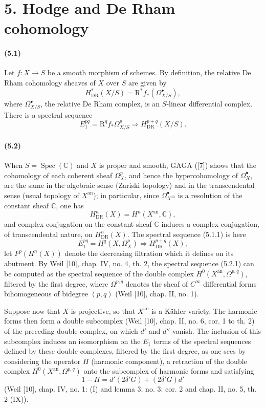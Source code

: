 \documentclass[10pt]{article}
\newcommand{\R}{\mathrm R}
\providecommand{\C}{\mathbb C}
\providecommand{\Spec}{\operatorname{Spec}}
\providecommand{\DR}{\operatorname{DR}}
\providecommand{\an}{\mathrm{an}}
\begin{document}
\section*{5. Hodge and De Rham cohomology}

\paragraph{(5.1)} Let $f:X\to S$ be a smooth morphism of schemes. By definition, the relative De Rham cohomology sheaves of $X$ over $S$ are given by
\[
H_{\DR}^*(X/S)=\R^*f_*(\Omega_{X/S}^\bullet),
\]
where $\Omega_{X/S}^\bullet$, the relative De Rham complex, is an $S$-linear differential complex. There is a spectral sequence
\[
\tag{5.1.1}
E_1^{pq}=\R^qf_*\Omega_{X/S}^p\Longrightarrow H_{\DR}^{p+q}(X/S).
\]

\paragraph{(5.2)} When $S=\Spec(\C)$ and $X$ is proper and smooth, GAGA ([7]) shows that the cohomology of each coherent sheaf $\Omega_X^p$, and hence the hypercohomology of $\Omega_X^\bullet$, are the same in the algebraic sense (Zariski topology) and in the transcendental sense (usual topology of $X^{\an}$); in particular, since $\Omega_{X^{\an}}^\bullet$ is a resolution of the constant sheaf $\C$, one has
\[
H_{\DR}^n(X)=H^n(X^{\an},\C),
\]
and complex conjugation on the constant sheaf $\C$ induces a complex conjugation, of transcendental nature, on $H_{\DR}^n(X)$. The spectral sequence (5.1.1) is here
\[
\tag{5.2.1}
E_1^{pq}=H^q(X,\Omega_X^p)\Longrightarrow H_{\DR}^{p+q}(X);
\]
let $F^p(H^n(X))$ denote the decreasing filtration which it defines on its abutment. By Weil [10], chap. IV, no. 4, th. 2, the spectral sequence (5.2.1) can be computed as the spectral sequence of the double complex $H^0(X^{\an},\Omega^{p,q})$, filtered by the first degree, where $\Omega^{p,q}$ denotes the sheaf of $C^\infty$ differential forms bihomogeneous of bidegree $(p,q)$ (Weil [10], chap. II, no. 1).

Suppose now that $X$ is projective, so that $X^{\an}$ is a Kähler variety. The harmonic forms then form a double subcomplex (Weil [10], chap. II, no. 6, cor. 1 to th. 2) of the preceding double complex, on which $d'$ and $d''$ vanish. The inclusion of this subcomplex induces an isomorphism on the $E_1$ terms of the spectral sequences defined by these double complexes, filtered by the first degree, as one sees by considering the operator $H$ (harmonic component), a retraction of the double complex $H^0(X^{\an},\Omega^{p,q})$ onto the subcomplex of harmonic forms and satisfying
\[
1-H=d'(2\delta'G)+(2\delta'G)d'
\]
(Weil [10], chap. IV, no. 1: (I) and lemma 3; no. 3: cor. 2 and chap. II, no. 5, th. 2 (IX)).
\end{document}
